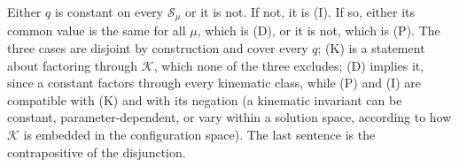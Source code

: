 Either $q$ is constant on every $\mathcal{S}_\mu$ or it is not. If not, it is (I). If so, either its common value is the same for all $\mu$, which is (D), or it is not, which is (P). The three cases are disjoint by construction and cover every $q$; (K) is a statement about factoring through $\mathcal{K}$, which none of the three excludes; (D) implies it, since a constant factors through every kinematic class, while (P) and (I) are compatible with (K) and with its negation (a kinematic invariant can be constant, parameter-dependent, or vary within a solution space, according to how $\mathcal{K}$ is embedded in the configuration space). The last sentence is the contrapositive of the disjunction.

